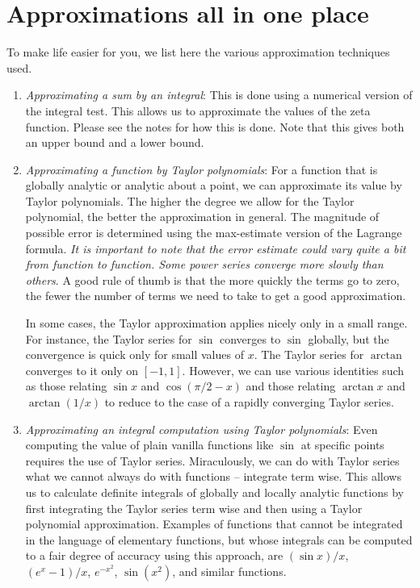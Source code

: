 \documentclass[10pt]{amsart}
\begin{document}
\section{Approximations all in one place}

To make life easier for you, we list here the various approximation
techniques used.

\begin{enumerate}
\item {\em Approximating a sum by an integral}: This is done using a
  numerical version of the integral test. This allows us to
  approximate the values of the zeta function. Please see the notes
  for how this is done. Note that this gives both an upper bound and a
  lower bound.
\item {\em Approximating a function by Taylor polynomials}: For a
  function that is globally analytic or analytic about a point, we can
  approximate its value by Taylor polynomials. The higher the degree
  we allow for the Taylor polynomial, the better the approximation in
  general. The magnitude of possible error is determined using the
  max-estimate version of the Lagrange formula. {\em It is important
  to note that the error estimate could vary quite a bit from function
  to function. Some power series converge more slowly than others}. A
  good rule of thumb is that the more quickly the terms go to zero,
  the fewer the number of terms we need to take to get a good
  approximation.

  In some cases, the Taylor approximation applies nicely only in a
  small range. For instance, the Taylor series for $\sin$ converges to
  $\sin$ globally, but the convergence is quick only for small values
  of $x$. The Taylor series for $\arctan$ converges to it only on
  $[-1,1]$. However, we can use various identities such as those
  relating $\sin x$ and $\cos(\pi/2 - x)$ and those relating $\arctan
  x$ and $\arctan(1/x)$ to reduce to the case of a rapidly converging
  Taylor series.
\item {\em Approximating an integral computation using Taylor
  polynomials}: Even computing the value of plain vanilla functions
  like $\sin$ at specific points requires the use of Taylor
  series. Miraculously, we can do with Taylor series what we cannot
  always do with functions -- integrate term wise. This allows us to
  calculate definite integrals of globally and locally analytic
  functions by first integrating the Taylor series term wise and then
  using a Taylor polynomial approximation. Examples of functions that
  cannot be integrated in the language of elementary functions, but
  whose integrals can be computed to a fair degree of accuracy using
  this approach, are $(\sin x)/x$, $(e^x - 1)/x$, $e^{-x^2}$,
  $\sin(x^2)$, and similar functions.


\end{enumerate}
\end{document}
